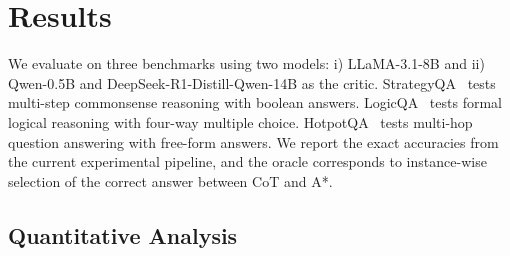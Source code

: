 \documentclass[11pt]{article}
\begin{document}
\section{Results}
\label{sec:results}

We evaluate on three benchmarks using two models: i) LLaMA-3.1-8B and ii) Qwen-0.5B and DeepSeek-R1-Distill-Qwen-14B as the critic. StrategyQA~\cite{geva2021did} tests multi-step commonsense reasoning with boolean answers. LogicQA~\cite{liu2020logiqa} tests formal logical reasoning with four-way multiple choice. HotpotQA~\cite{yang2018hotpotqa} tests multi-hop question answering with free-form answers. We report the exact accuracies from the current experimental pipeline, and the oracle corresponds to instance-wise selection of the correct answer between CoT and A*.

\subsection{Quantitative Analysis}
\label{sec:quantitative}



\end{document}
